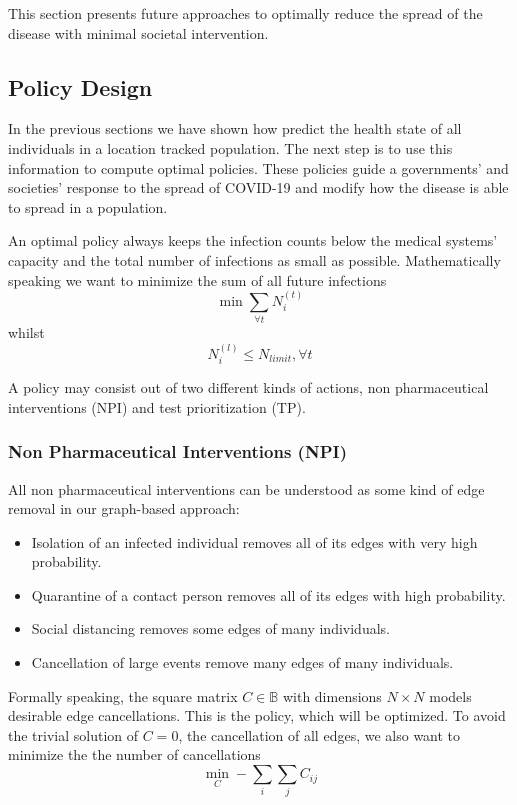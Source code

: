 This section presents future approaches to optimally reduce the spread of the disease with minimal societal intervention.


\subsection{Policy Design}
In the previous sections we have shown how predict the health state of all individuals in a location tracked population.
The next step is to use this information to compute optimal policies.
These policies guide a governments' and societies' response to the spread of COVID-19 and modify how the disease is able to spread in a population.

An optimal policy always keeps the infection counts below the medical systems' capacity and the total number of infections as small as possible.
Mathematically speaking we want to minimize the sum of all future infections
\begin{equation}
	\min \sum_{\forall t} N^{(t)}_i
\end{equation}
whilst
\begin{equation}
	N^{(l)}_i \leq N_{limit}, \forall t
\end{equation}

A policy may consist out of two different kinds of actions, non pharmaceutical interventions (NPI) and test prioritization (TP).


\subsubsection{Non Pharmaceutical Interventions (NPI)}
All non pharmaceutical interventions can be understood as some kind of edge removal in our graph-based approach:
\begin{itemize}
	\item Isolation of an infected individual removes all of its edges with very high probability.
	\item Quarantine of a contact person removes all of its edges with high probability.
	\item Social distancing removes some edges of many individuals.
	\item Cancellation of large events remove many edges of many individuals.
\end{itemize}

Formally speaking, the square matrix $C \in \mathbb{B}$ with dimensions $N \times N$ models desirable edge cancellations.
This is the policy, which will be optimized.
To avoid the trivial solution of $C=0$, the cancellation of all edges, we also want to minimize the the number of cancellations
\begin{equation}
	\min_{C} -\sum_i \sum_j C_{ij}
\end{equation}


